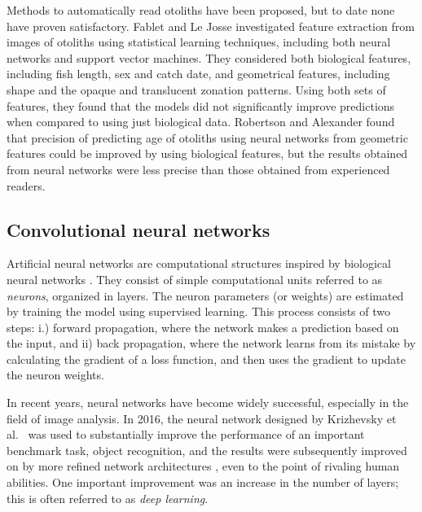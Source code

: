 \documentclass[10pt,letterpaper]{article}
\begin{document}
Methods to automatically read otoliths have been proposed, but to date none have proven satisfactory.
Fablet and Le Josse \cite{fablet2005automated} investigated feature extraction from images of otoliths using statistical learning techniques, including both neural networks and support vector machines. They considered both biological features, including fish length, sex and catch date, and geometrical features, including shape and the opaque and translucent zonation patterns. Using both sets of features, they found that the models did not significantly improve predictions when compared to using just biological data. 
Robertson and Alexander \cite{robertson2001development} found that precision of predicting age of otoliths using neural networks from geometric features could be improved by using biological features, but the results obtained from neural networks were less precise than those obtained from experienced readers. 

\subsection*{Convolutional neural networks}

Artificial neural networks are computational structures inspired by biological neural networks \citep{10.3389/fncom.2017.00114}. They consist of simple computational units referred to as \emph{neurons}, organized in layers. The neuron parameters (or weights) are estimated by training the model using supervised learning. This process consists of two steps: i.) forward propagation, where the network makes a prediction based on the input, and ii) back propagation, where the network learns from its mistake by calculating the gradient of a loss function, and then uses the gradient to update the neuron weights.

In recent years, neural networks have become widely successful, especially in the field of image analysis. In 2016, the neural network designed by
Krizhevsky et al.\ \cite{krizhevsky2012imagenet} was used to substantially improve the performance of an important benchmark task, object recognition, and the results were subsequently improved on by more refined network architectures \citep{he2016deep,lin2013network,simonyan2014very}, even to the point of rivaling human abilities.  One important improvement was an increase in the number of layers; this is often referred to as \emph{deep learning}.
\end{document}
